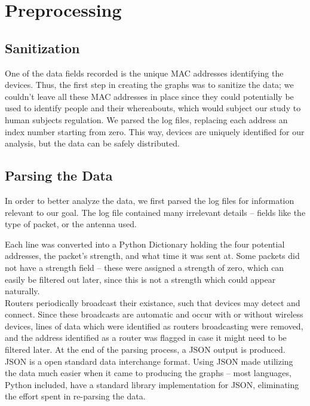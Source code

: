 \documentclass[letterpaper,abstract=on,titlepage=false]{scrreprt}
\begin{document}
	\section*{Preprocessing}

		\subsection*{Sanitization}
    One of the data fields recorded is the unique MAC addresses identifying the devices.
		Thus, the first step in creating the graphs was to sanitize the data; we couldn't leave all these MAC addresses in place since they could potentially be used to identify people and their whereabouts, which would subject our study to human subjects regulation.
    We parsed the log files, replacing each address an index number starting from zero.
		This way, devices are uniquely identified for our analysis, but the data can be safely distributed.

		\subsection*{Parsing the Data}
		In order to better analyze the data, we first parsed the log files for information relevant to our goal.
		The log file contained many irrelevant details -- fields like the type of packet, or the antenna used.

    Each line was converted into a Python Dictionary holding the four potential addresses, the packet's strength, and what time it was sent at. %
    Some packets did not have a strength field -- these were assigned a strength of zero, which can easily be filtered out later, since this is not a strength which could appear naturally.
		\\
		Routers periodically broadcast their existance, such that devices may detect and connect.
    Since these broadcasts are automatic and occur with or without wireless devices, lines of data which were identified as routers broadcasting were removed, and the address identified as a router was flagged in case it might need to be filtered later.
    At the end of the parsing process, a JSON output is produced.
    JSON is a open standard data interchange format.
    Using JSON made utilizing the data much easier when it came to producing the graphs -- most languages, Python included, have a standard library implementation for JSON, eliminating the effort spent in re-parsing the data.
\end{document}
